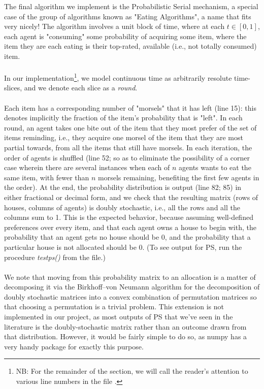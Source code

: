 \documentclass[12pt]{article}
\begin{document}
The final algorithm we implement is the Probabilistic Serial mechanism, a special case of the group of algorithms known as "Eating Algorithms", a name that fits very nicely! The algorithm involves a unit block of time, where at each $t \in [0, 1]$, each agent is "consuming" some probability of acquiring some item, where the item they are each eating is their top-rated, available (i.e., not totally consumed) item.\\\\In our implementation\footnote{NB: For the remainder of the section, we will call the reader's attention to various line numbers in the file .}, we model continuous time as arbitrarily resolute time-slices, and we denote each slice as a \emph{round}.
\\\\Each item has a corresponding number of "morsels" that it has left (line 15): this denotes implicitly the fraction of the item's probability that is "left". In each round, an agent takes one bite out of the item that they most prefer of the set of items reminding, i.e., they acquire one morsel of the item that they are most partial towards, from all the items that still have morsels. In each iteration, the order of agents is shuffled (line 52; so as to eliminate the possibility of a corner case wherein there are several instances when each of $n$ agents wants to eat the same item, with fewer than $n$ morsels remaining, benefiting the first few agents in the order). At the end, the probability distribution is output (line 82; 85) in either fractional or decimal form, and we check that the resulting matrix (rows of houses, columns of agents) is doubly stochastic, i.e., all the rows and all the columns sum to 1. This is the expected behavior, because assuming well-defined preferences over every item, and that each agent owns a house to begin with, the probability that an agent gets no house should be 0, and the probability that a particular house is not allocated should be 0. (To see output for PS, run the procedure \emph{test\textunderscore ps()} from the file.)\\\\We note that moving from this probability matrix to an allocation is a matter of decomposing it via the Birkhoff–von Neumann algorithm for the decomposition of doubly stochastic matrices into a convex combination of permutation matrices so that choosing a permutation is a trivial problem. This extension is not implemented in our project, as most outputs of PS that we've seen in the literature is the doubly-stochastic matrix rather than an outcome drawn from that distribution. However, it would be fairly simple to do so, as numpy has a very handy package for exactly this purpose.
 
\end{document}
